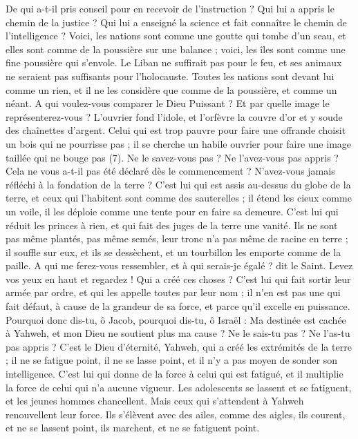 \begin{multicols}{2}
De qui a-t-il pris conseil pour en recevoir de l’instruction ? Qui lui a appris le chemin de la justice ? Qui lui a enseigné la science et fait connaître le chemin de l’intelligence ?
Voici, les nations sont comme une goutte qui tombe d'un seau, et elles sont comme de la poussière sur une balance ; voici, les îles sont comme une fine poussière qui s’envole.
Le Liban ne suffirait pas pour le feu, et ses animaux ne seraient pas suffisants pour l'holocauste.
Toutes les nations sont devant lui comme un rien, et il ne les considère que comme de la poussière, et comme un néant.
A qui voulez-vous comparer le Dieu Puissant ? Et par quelle image le représenterez-vous ?
L'ouvrier fond l’idole, et l'orfèvre la couvre d’or et y soude des chaînettes d'argent.
Celui qui est trop pauvre pour faire une offrande choisit un bois qui ne pourrisse pas ; il se cherche un habile ouvrier pour faire une image taillée qui ne bouge pas (7).
Ne le savez-vous pas ? Ne l’avez-vous pas appris ? Cela ne vous a-t-il pas été déclaré dès le commencement ? N’avez-vous jamais réfléchi à la fondation de la terre ?
C'est lui qui est assis au-dessus du globe de la terre, et ceux qui l’habitent sont comme des sauterelles ; il étend les cieux comme un voile, il les déploie comme une tente pour en faire sa demeure.
C'est lui qui réduit les princes à rien, et qui fait des juges de la terre une vanité.
Ils ne sont pas même plantés, pas même semés, leur tronc n’a pas même de racine en terre ; il souffle sur eux, et ils se dessèchent, et un tourbillon les emporte comme de la paille.
A qui me ferez-vous ressembler, et à qui serais-je égalé ? dit le Saint.
Levez vos yeux en haut et regardez ! Qui a créé ces choses ? C’est lui qui fait sortir leur armée par ordre, et qui les appelle toutes par leur nom ; il n’en est pas une qui fait défaut, à cause de la grandeur de sa force, et parce qu'il excelle en puissance.
Pourquoi donc dis-tu, ô Jacob, pourquoi dis-tu, ô Israël : Ma destinée est cachée à Yahweh, et mon Dieu ne soutient plus ma cause ?
Ne le sais-tu pas ? Ne l’as-tu pas appris ? C’est le Dieu d'éternité, Yahweh, qui a créé les extrémités de la terre ; il ne se fatigue point, il ne se lasse point, et il n'y a pas moyen de sonder son intelligence.
C'est lui qui donne de la force à celui qui est fatigué, et il multiplie la force de celui qui n'a aucune vigueur.
Les adolescents se lassent et se fatiguent, et les jeunes hommes chancellent.
Mais ceux qui s'attendent à Yahweh renouvellent leur force. Ils s’élèvent avec des ailes, comme des aigles, ils courent, et ne se lassent point, ils marchent, et ne se fatiguent point.

\end{multicols}
